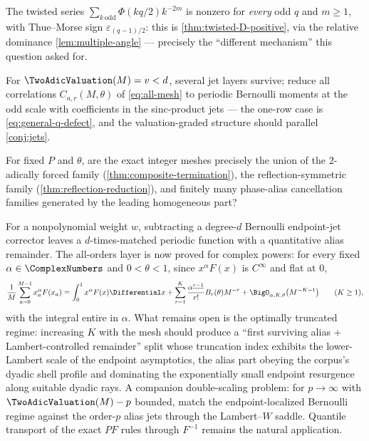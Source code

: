 \documentclass[11pt,oneside]{article}
\numberwithin{equation}{section}
\theoremstyle{definition}
\theoremstyle{remark}
\newcommand{\eps}{\varepsilon}
\newcommand{\fall}[2]{#1^{\underline{#2}}}
\begin{document}
\begin{remark}
\label{q:twisted-D-positivity}
The twisted series $\sum_{k\,\mathrm{odd}}\Phi(kq/2)k^{-2m}$ is
nonzero for \emph{every} odd $q$ and $m\ge1$, with Thue--Morse sign
$\eps_{(q-1)/2}$: this is \cref{thm:twisted-D-positive}, via the
relative dominance \cref{lem:multiple-angle} --- precisely the
``different mechanism'' this question asked for.
\end{remark}

\begin{question}
\label{q:defect-hierarchy}
For $\TwoAdicValuation(M)=v<d$, several jet layers survive; reduce all
correlations $C_{a,r}(M,\theta)$ of \eqref{eq:all-mesh} to periodic
Bernoulli moments at the odd scale with coefficients in the
sinc-product jets --- the one-row case is
\eqref{eq:general-q-defect}, and the valuation-graded structure
should parallel \cref{conj:jets}.
\end{question}

\begin{question}
\label{q:mesh-classification}
For fixed $P$ and $\theta$, are the exact integer meshes precisely the
union of the $2$-adically forced family
(\cref{thm:composite-termination}), the reflection-symmetric family
(\cref{thm:reflection-reduction}), and finitely many phase-alias
cancellation families generated by the leading homogeneous part?
\end{question}

\begin{question}
\label{q:analytic-weights}
For a nonpolynomial weight $w$, subtracting a degree-$d$ Bernoulli
endpoint-jet corrector leaves a $d$-times-matched periodic function
with a quantitative alias remainder.  The all-orders layer is now
proved for complex powers: for every fixed $\alpha\in\ComplexNumbers$ and
$0<\theta<1$, since $x^{\alpha}F(x)$ is $C^\infty$ and flat at $0$,
\begin{equation}
 \frac1M\sum_{a=0}^{M-1}x_a^{\alpha}F(x_a)
 =\int_0^1x^{\alpha}F(x)\Differential x
 +\sum_{r=1}^{K}\frac{\fall\alpha{r-1}}{r!}B_r(\theta)M^{-r}
 +\BigO_{\alpha,K,\theta}\bigl(M^{-K-1}\bigr)
 \qquad(K\ge1),
 \label{eq:complex-alpha-EM}
\end{equation}
with the integral entire in $\alpha$.  What remains open is the
optimally truncated regime: increasing $K$ with the mesh should
produce a ``first surviving alias + Lambert-controlled remainder''
split whose truncation index exhibits the lower-Lambert scale of the
endpoint asymptotics, the alias part obeying the corpus's dyadic
shell profile and dominating the exponentially small endpoint
resurgence along suitable dyadic rays.  A companion double-scaling
problem: for $p\to\infty$ with $\TwoAdicValuation(M)-p$ bounded, match the
endpoint-localized Bernoulli regime against the order-$p$ alias jets
through the Lambert--$W$ saddle.  Quantile transport of the exact
$PF$ rules through $F^{-1}$ remains the natural application.
\end{question}
\end{document}
